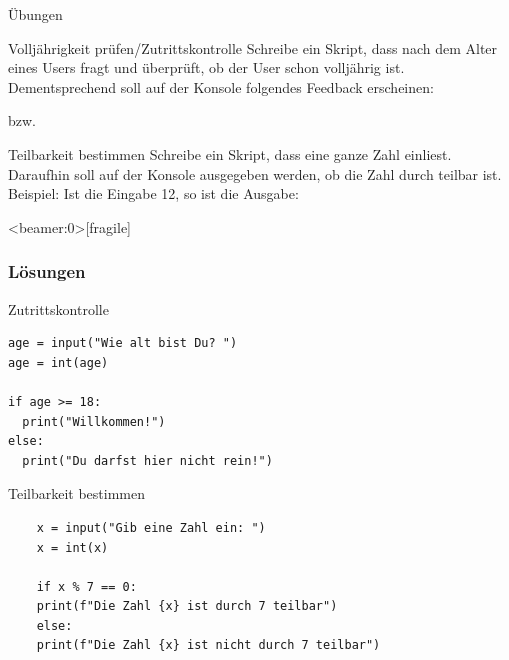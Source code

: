 \begin{frame}{Übungen}

	\begin{block}{Volljährigkeit prüfen/Zutrittskontrolle}
		\vspace{2pt}
		Schreibe ein Skript, dass nach dem Alter eines Users fragt und überprüft, ob der User schon volljährig ist. Dementsprechend soll auf der Konsole folgendes Feedback erscheinen:  
		
		
		 bzw.
		 
		  
	\end{block}
\pause 
\vspace{12pt}
	\begin{block}{Teilbarkeit bestimmen}
		\vspace{2pt}
		Schreibe ein Skript, dass eine ganze Zahl einliest. Daraufhin soll auf der Konsole ausgegeben werden, ob die Zahl durch  teilbar ist. Beispiel: Ist die Eingabe 12, so ist die Ausgabe:   

	\end{block}

\end{frame}

\begin{frame}<beamer:0>[fragile]
\frametitle{Lösungen}
\begin{solutionblock}{Zutrittskontrolle}
\begin{verbatim}
age = input("Wie alt bist Du? ")
age = int(age)

if age >= 18:
  print("Willkommen!")
else:
  print("Du darfst hier nicht rein!")
\end{verbatim}
\end{solutionblock}
\vspace{12pt}
\begin{solutionblock}{Teilbarkeit bestimmen}
	\begin{verbatim}
	x = input("Gib eine Zahl ein: ")
	x = int(x)
	
	if x % 7 == 0:
	print(f"Die Zahl {x} ist durch 7 teilbar")
	else:
	print(f"Die Zahl {x} ist nicht durch 7 teilbar")
	\end{verbatim}
\end{solutionblock}
\end{frame}


